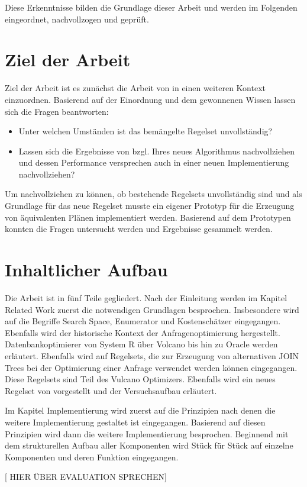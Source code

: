 Diese Erkenntnisse bilden die Grundlage dieser Arbeit und werden im Folgenden eingeordnet, nachvollzogen und geprüft.

\section{Ziel der Arbeit}

Ziel der Arbeit ist es zunächst die Arbeit von \cite{shanbhag2014optimizing} in einen weiteren Kontext einzuordnen. Basierend auf der Einordnung und dem gewonnenen Wissen lassen sich die Fragen beantworten:

\begin{itemize}
\item Unter welchen Umständen ist das bemängelte Regelset unvollständig? 
\item Lassen sich die Ergebnisse von \cite{shanbhag2014optimizing} bzgl. Ihres neues Algorithmus nachvollziehen und dessen Performance versprechen auch in einer neuen Implementierung nachvollziehen?
\end{itemize}

Um nachvollziehen zu können, ob bestehende Regelsets unvollständig sind und als Grundlage für das neue Regelset musste ein eigener Prototyp für die Erzeugung von äquivalenten Plänen implementiert werden. Basierend auf dem Prototypen konnten die Fragen untersucht werden und Ergebnisse gesammelt werden.







\section{Inhaltlicher Aufbau}
Die Arbeit ist in fünf Teile gegliedert. Nach der Einleitung werden im Kapitel Related Work zuerst die notwendigen Grundlagen besprochen. Insbesondere wird auf die Begriffe Search Space, Enumerator und Kostenschätzer eingegangen. Ebenfalls wird der historische Kontext der Anfragenoptimierung hergestellt. Datenbankoptimierer von System R über Volcano bis hin zu Oracle werden erläutert. Ebenfalls wird auf Regelsets, die zur Erzeugung von alternativen JOIN Trees bei der Optimierung einer Anfrage verwendet werden können eingegangen. Diese Regelsets sind Teil des Vulcano Optimizers. Ebenfalls wird ein neues Regelset von \cite{shanbhag2014optimizing} vorgestellt und der Versuchsaufbau erläutert. 

Im Kapitel Implementierung wird zuerst auf die Prinzipien nach denen die weitere Implementierung gestaltet ist eingegangen. Basierend auf diesen Prinzipien wird dann die weitere Implementierung besprochen. Beginnend mit dem strukturellen Aufbau aller Komponenten wird Stück für Stück auf einzelne Komponenten und deren Funktion eingegangen.

[ HIER ÜBER EVALUATION SPRECHEN]



 